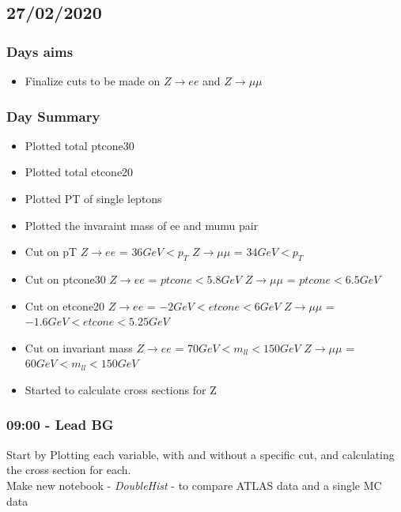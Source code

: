 \subsection*{\textbf{27/02/2020}}
\subsubsection*{Days aims}
\begin{itemize}
    \item Finalize cuts to be made on $Z \rightarrow ee$ and $Z \rightarrow \mu\mu$
\end{itemize}

\subsubsection*{Day Summary}
\begin{itemize}
    \item Plotted total ptcone30
    \item Plotted total etcone20 
    \item Plotted PT of single leptons 
    \item Plotted the invaraint mass of ee and mumu pair 

    \item Cut on pT
    \subitem $Z \rightarrow ee$ = $36 GeV < p_T$
    \subitem $Z \rightarrow \mu\mu$ = $34 GeV < p_T$
    
    \item Cut on ptcone30 
    \subitem $Z \rightarrow ee$ = $ ptcone < 5.8 GeV$
    \subitem $Z \rightarrow \mu\mu$ = $ ptcone < 6.5 GeV$
    
    \item Cut on etcone20 
    \subitem $Z \rightarrow ee$ = $ -2 GeV < etcone < 6 GeV$
    \subitem $Z \rightarrow \mu\mu$ = $ -1.6 GeV < etcone < 5.25 GeV$
    
    \item Cut on invariant mass  
    \subitem $Z \rightarrow ee$ = $70 GeV < m_{ll} < 150 GeV$
    \subitem $Z \rightarrow \mu\mu$ = $60 GeV < m_{ll} < 150 GeV$
    
    \item Started to calculate cross sections for Z
\end{itemize}

\subsubsection*{09:00 - Lead BG}
Start by Plotting each variable, with and without a specific cut, and calculating the cross section for each.
\\
Make new notebook - \textit{DoubleHist} - to compare ATLAS data and a single MC data 

